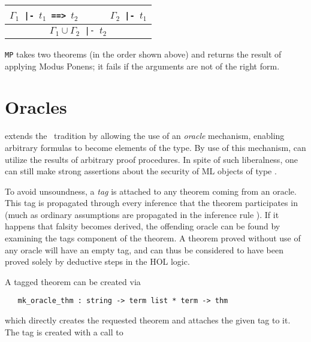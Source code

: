 \begin{center}
\begin{tabular}{c}
$\Gamma_1${\small\verb+ |- +}$t_1${\small\verb+ ==> +}$t_2$ {\small\verb+     +} $\Gamma_2${\small\verb+ |- +}$t_1$ \\
\hline
$\Gamma_1 \cup \Gamma_2${\small\verb+ |- +}$t_2$ \\
\end{tabular}
\end{center}

\noindent
{\small\verb+MP+} takes two theorems (in the order shown above) and returns
the result of applying Modus Ponens; it fails if the arguments are not of the
right form.

\section{Oracles}

\HOL{} extends the \LCF\ tradition by allowing the use of an
\emph{oracle} mechanism, enabling arbitrary formulas to become
elements of the  type. By use of this mechanism, \HOL{} can
utilize the results of arbitrary proof procedures. In spite of such
liberalness, one can still make strong assertions about the security
of ML objects of type .

To avoid unsoundness, a \emph{tag} is attached to any theorem coming
from an oracle. This tag is propagated through every inference that
the theorem participates in (much as ordinary assumptions are
propagated in the inference rule ). If it happens that falsity
becomes derived, the offending oracle can be found by examining the
tags component of the theorem. A theorem proved without use of any
oracle will have an empty tag, and can thus be considered to have been
proved solely by deductive steps in the HOL logic.

A tagged theorem can be created via

\begin{holboxed}
\begin{verbatim}
   mk_oracle_thm : string -> term list * term -> thm
\end{verbatim}
\end{holboxed}

which directly creates the requested theorem and attaches the given
tag to it. The tag is created with a call to

